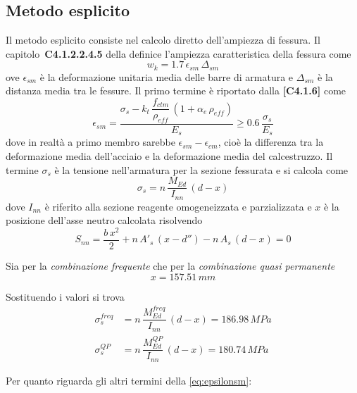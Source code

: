 \subsection{Metodo esplicito}
Il metodo esplicito consiste nel calcolo diretto dell'ampiezza di fessura. Il capitolo~\textbf{C4.1.2.2.4.5} della \circolare definice l'ampiezza caratteristica della fessura come
\begin{equation}
	\label{eq:wk}
	w_k = 1.7\,\epsilon_{sm}\,\Delta_{sm}
\end{equation}
ove $\epsilon_{sm}$ è la deformazione unitaria media delle barre di armatura e $\Delta_{sm}$ è la distanza media tra le fessure. Il primo termine è riportato dalla \textbf{[C4.1.6]} come
\begin{equation}
    \label{eq:epsilonsm}
	\epsilon_{sm} = \dfrac{\sigma_s - k_t\,\dfrac{f_{ctm}}{\rho_{eff}}\,(1+\alpha_e\,\rho_{eff})}{E_s} \geq 0.6\,\dfrac{\sigma_s}{E_s}
\end{equation}
dove in realtà a primo membro sarebbe $\epsilon_{sm} - \epsilon_{cm}$, cioè la differenza tra la deformazione media dell'acciaio e la deformazione media del calcestruzzo.
Il termine $\sigma_s$ è la tensione nell'armatura per la sezione fessurata e si calcola come 
\[
\sigma_s = n\,\dfrac{M_{Ed}}{I_{nn}}\,(d-x)
\]
dove $I_{nn}$ è riferito alla sezione reagente omogeneizzata e parzializzata e $x$ è la posizione dell'asse neutro calcolata risolvendo
\[
S_{nn} =  \dfrac{b\,x^2}{2} + n\,A'_s\,(x-d'') - n\,A_s\,(d-x) = 0
\]

Sia per la \textit{combinazione frequente} che per la \textit{combinazione quasi permanente}
\[
    x = 157.51\,mm
\]

Sostituendo i valori si trova
\begin{align}
	\label{eq:sigmas_freq}
	\sigma_s^{freq} &= n\,\dfrac{M_{Ed}^{freq}}{I_{nn}}\,(d-x) = 186.98\,MPa\\
	\label{eq:sigmas_qp}
	\sigma_s^{QP} &= n\,\dfrac{M_{Ed}^{QP}}{I_{nn}}\,(d-x) = 180.74\,MPa
\end{align}

Per quanto riguarda gli altri termini della \eqref{eq:epsilonsm}:

